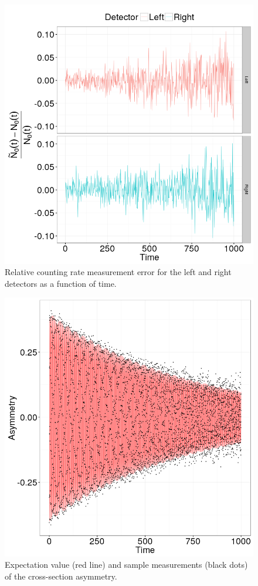 \documentclass{article}
\begin{document}
\begin{figure}[h]
	\centering
	\includegraphics[scale=.85]{img/Final/LR_detector_relErr}
	\caption{Relative counting rate measurement error for the left and right detectors as a function of time.\label{fig:LRDetErr}}
\end{figure}

\begin{figure}[h]
	\centering
	\includegraphics[scale=.85]{img/Final/Asymmetry}
	\caption{Expectation value (red line) and sample measurements (black dots) of the cross-section asymmetry.\label{fig:Asym}}
\end{figure}
\end{document}
